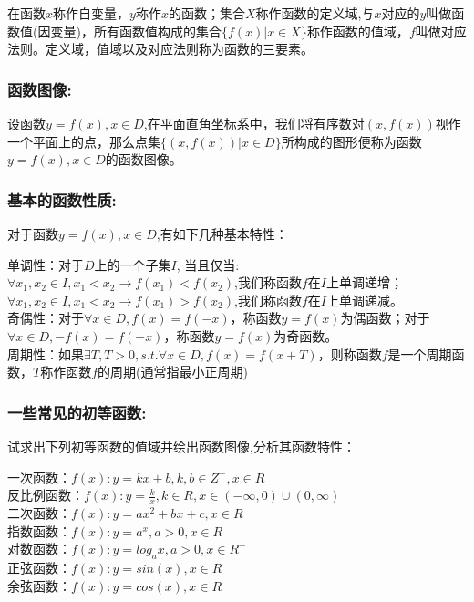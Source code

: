 \documentclass[UTF8]{article}
\begin{document}
在函数$x$称作自变量，$y$称作$x$的函数；集合$X$称作函数的定义域,与$x$对应的$y$叫做函数值(因变量)，所有函数值构成的集合$\{f(x)|x\in X\}$称作函数的值域，$f$叫做对应法则。定义域，值域以及对应法则称为函数的三要素。

\subsubsection{函数图像:}

设函数$y = f(x),x\in D$,在平面直角坐标系中，我们将有序数对$(x, f(x))$视作一个平面上的点，那么点集$\{(x, f(x)) | x \in D\}$所构成的图形便称为函数$y = f(x),x\in D$的函数图像。



\subsubsection{基本的函数性质:}

对于函数$y = f(x), x\in D$,有如下几种基本特性：

单调性：对于$D$上的一个子集$I$, 当且仅当:\\
$\forall x_1, x_2 \in I, x_1 < x_2 \rightarrow f(x_1) < f(x_2)$,我们称函数$f$在$I$上单调递增；\\
$\forall x_1, x_2 \in I, x_1 < x_2 \rightarrow f(x_1) > f(x_2)$,我们称函数$f$在$I$上单调递减。\\

奇偶性：对于$\forall x \in D, f(x) = f(-x)$，称函数$y = f(x)$为偶函数；对于$\forall x \in D, -f(x) = f(-x)$，称函数$y = f(x)$为奇函数。\\

周期性：如果$\exists T, T > 0, s.t. \forall x \in D, f(x) = f(x + T)$，则称函数$f$是一个周期函数，$T$称作函数$f$的周期(通常指最小正周期)

\subsubsection{一些常见的初等函数:}

试求出下列初等函数的值域并绘出函数图像,分析其函数特性：

一次函数：$f(x) : y = kx + b, k, b\in Z^{+}, x \in R$\\

反比例函数：$f(x) : y = \frac{k}{x}, k\in R, x \in (-\infty, 0)\cup (0, \infty)$\\

二次函数：$f(x) : y = ax^2 + bx + c, x\in R$\\

指数函数：$f(x) : y = a^x, a > 0, x \in R$\\

对数函数：$f(x) : y = log_a x, a > 0, x \in R^{+}$\\

正弦函数：$f(x) : y = sin(x), x \in R$\\

余弦函数：$f(x) : y = cos(x), x \in R$
\end{document}
